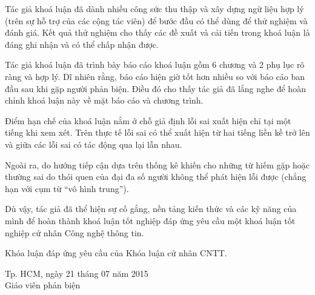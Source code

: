 \begin{titlepage}
Tác giả khoá luận đã dành nhiều công sức thu thập và xây dựng ngữ liệu hợp lý (trên sự hỗ trợ của các cộng tác viên) để bước đầu có thể dùng để thử nghiệm và đánh giá.
Kết quả thử nghiệm cho thấy các đề xuất và cải tiến trong khoá luận là đáng ghi nhận và có thể chấp nhận được.

Tác giả khoá luận đã trình bày báo cáo khoá luận gồm 6 chương và 2 phụ lục rõ ràng và hợp lý.
Dĩ nhiên rằng, báo cáo hiện giờ tốt hơn nhiều so với báo cáo ban đầu sau khi gặp người phản biện.
Điều đó cho thấy tác giả đã lắng nghe để hoàn chỉnh khoá luận này về mặt báo cáo và chương trình.

Điểm hạn chế của khoá luận nằm ở chỗ giả định lỗi sai xuất hiện chỉ tại một tiếng khi xem xét.
Trên thực tế lỗi sai có thể xuất hiện từ hai tiếng liền kề trở lên và giữa các lỗi sai có tác động qua lại lẫn nhau.

Ngoài ra, do hướng tiếp cận dựa trên thống kê khiến cho những từ hiếm gặp hoặc thường sai do thói quen của đại đa số người không thể phát hiện lỗi được (chẳng hạn với cụm từ ``vô hình trung'').

Dù vậy, tác giả đã thể hiện sự cố gắng, nền tảng kiến thức và các kỹ năng của mình để hoàn thành khoá luận tốt nghiệp đáp ứng yêu cầu một khoá luận tốt nghiệp cử nhân Công nghệ thông tin.

\vfill

\begin{flushleft}
Khóa luận đáp ứng yêu cầu của Khóa luận cử nhân CNTT.
\end{flushleft}

\begin{center}
\leavevmode{\parindent=6em\indent} Tp. HCM, ngày 21 tháng 07 năm 2015\\
\leavevmode{\parindent=6em\indent} Giáo viên phản biện\\[2cm]
\leavevmode{\parindent=6em\indent} \tenGVPB
\end{center}

\end{titlepage}